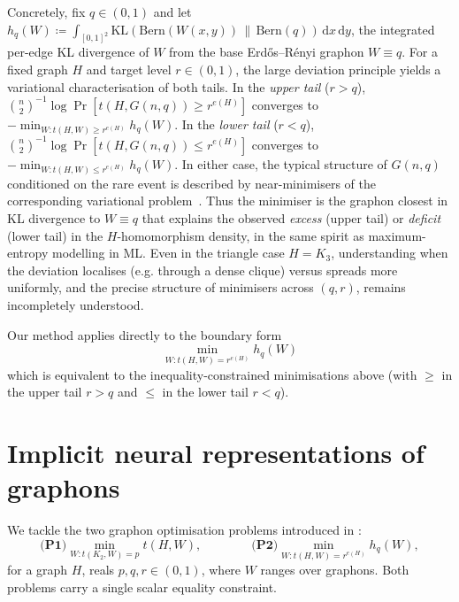 \documentclass{article}
\theoremstyle{plain}
\theoremstyle{definition}
\theoremstyle{remark}
\begin{document}
Concretely, fix $q \in (0,1)$ and let $h_q(W) \coloneqq \int_{[0,1]^2} \mathrm{KL}(\mathrm{Bern}(W(x,y))\,\|\,\mathrm{Bern}(q))\,\mathrm{d}x\,\mathrm{d}y$, the integrated per-edge KL divergence of $W$ from the base Erd\H{o}s--R\'enyi graphon $W \equiv q$.
For a fixed graph $H$ and target level $r \in (0,1)$, the large deviation principle yields a variational characterisation of both tails.
In the \emph{upper tail} ($r > q$), $\binom{n}{2}^{-1}\log\Pr[t(H, G(n,q)) \ge r^{e(H)}]$ converges to $-\min_{W: t(H,W) \ge r^{e(H)}} h_q(W)$.
In the \emph{lower tail} ($r < q$), $\binom{n}{2}^{-1}\log\Pr[t(H, G(n,q)) \le r^{e(H)}]$ converges to $-\min_{W: t(H,W) \le r^{e(H)}} h_q(W)$.
In either case, the typical structure of $G(n,q)$ conditioned on the rare event is described by near-minimisers of the corresponding variational problem~\citep{lubetzky2015replica}.
Thus the minimiser is the graphon closest in KL divergence to $W \equiv q$ that explains the observed \emph{excess} (upper tail) or \emph{deficit} (lower tail) in the $H$-homomorphism density, in the same spirit as maximum-entropy modelling in ML\@.
Even in the triangle case $H = K_3$, understanding when the deviation localises (e.g. through a dense clique) versus spreads more uniformly, and the precise structure of minimisers across $(q,r)$, remains incompletely understood.

Our method applies directly to the boundary form
\begin{equation}
\label{eqn:large-deviation-problem}
  \min_{W : t(H,W) = r^{e(H)}} h_q(W)
\end{equation}
which is equivalent to the inequality-constrained minimisations above (with $\ge$ in the upper tail $r>q$ and $\le$ in the lower tail $r<q$).

\section{Implicit neural representations of graphons} \label{sec:method}

We tackle the two graphon optimisation problems introduced in :
\begin{equation}
\textbf{(P1)} \min_{W : t(K_2, W) = p}  t(H, W),
\qquad\qquad
\textbf{(P2)} \min_{W : t(H, W) = r^{e(H)}} h_q(W),
\label{eqn:targetproblems}
\end{equation}
for a graph $H$, reals $p,q,r \in (0,1)$, where $W$ ranges over graphons. Both problems carry a single scalar equality constraint.
\end{document}
